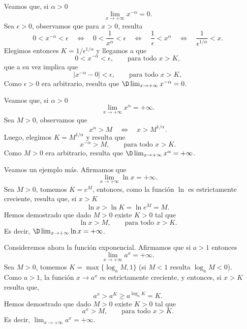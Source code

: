 \begin{example}
    Veamos que, si $\alpha>0$
    \[
    \lim_{x\to+\infty} x^{-\alpha} = 0.
    \]
    Sea $\epsilon>0$, observamos que para $x>0$, resulta
    \[
    0<x^{-\alpha}<\epsilon
    \quad\iff\quad
    0<\frac{1}{x^{\alpha}}<\epsilon
    \quad\iff\quad
    \frac1\epsilon<x^\alpha
    \quad\iff\quad
    \frac1{\epsilon^{1/\alpha}}<x.
    \]
    Elegimos entonces $K=1/{\epsilon^{1/\alpha}}$ y llegamos a que
    \[
    0< x^{-\alpha } < \epsilon, \qquad\text{para todo $x>K$},
    \]
    que a su vez implica que
    \[
    |x^{-\alpha } - 0| < \epsilon, \qquad\text{para todo $x>K$},
    \]
    Como $\epsilon>0$ era arbitrario, resulta que $\D\lim_{x\to+\infty} x^{-\alpha} = 0$.
\end{example}


\begin{example}
    Veamos que, si $\alpha>0$
    \[
    \lim_{x\to+\infty} x^{\alpha} = +\infty.
    \]
    Sea $M>0$, observamos que 
    \[
    x^\alpha > M
    \quad\iff\quad
    x > M^{1/\alpha}.
    \]
    Luego, elegimos $K = M^{1/\alpha}$ y resulta que 
    \[
    x^{-\alpha } > M, \qquad\text{para todo $x>K$}.
    \]
    Como $M>0$ era arbitrario, resulta que $\D\lim_{x\to+\infty} x^{\alpha} = +\infty$.
\end{example}

\begin{example}
    Veamos un ejemplo más. Afirmamos que 
    \[
    \lim_{x\to+\infty} \ln x = +\infty.
    \]
    Sea $M>0$, tomemos $K=e^M$, entonces, como la función $\ln$ es estrictamente creciente, resulta que, si $x>K$
    \[
    \ln x > \ln K = \ln e^M = M.
    \]
    Hemos demostrado que dado $M>0$ existe $K>0$ tal que 
    \[
    \ln x > M, 
        \qquad\text{para todo $x>K$}.
    \]
    Es decir, $\D\lim_{x\to+\infty} \ln x = +\infty$.
\end{example}

\begin{example}
    Consideremos ahora la función exponencial. Afirmamos que si $a>1$ entonces
    \[
    \lim_{x\to+\infty} a^x = +\infty.
    \]
    Sea $M>0$, tomemos $K=\max\{\log_a M, 1\}$ (si $M<1$ resulta $\log_a M<0$). Como $a>1$, la función $x\to a^x$ es estrictamente creciente, y entonces, si $x>K$ resulta que,
    \[
    a^x > a^K \ge a^{\log_a K} = K.
    \]
    Hemos demostrado que dado $M>0$ existe $K>0$ tal que 
    \[
    a^x > M, 
        \qquad\text{para todo $x>K$}.
    \]
    Es decir, $\lim_{x\to+\infty} a^x = +\infty$.
\end{example}

